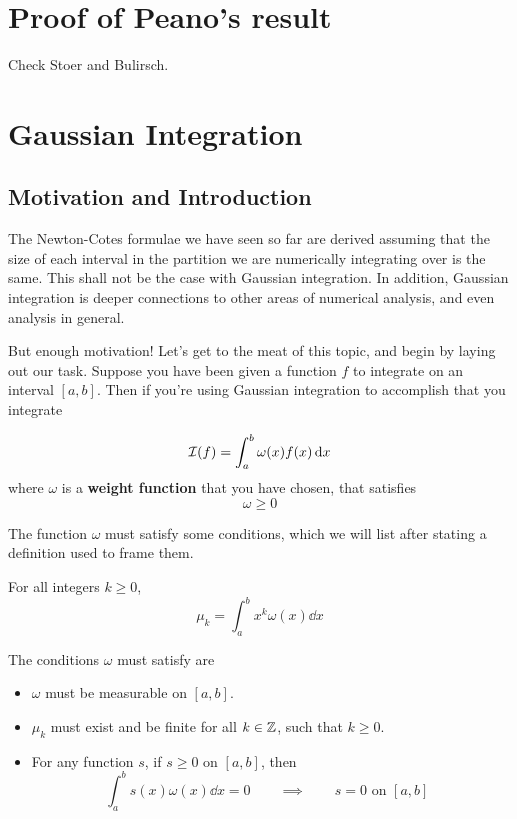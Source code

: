 
\section{Proof of Peano's result}

Check Stoer and Bulirsch.

\section{Gaussian Integration}

\subsection{Motivation and Introduction}

The Newton-Cotes formulae we have seen so far are derived assuming that the size of each interval in the partition we are numerically integrating over is the same. This shall not be the case with Gaussian integration. In addition, Gaussian integration is deeper connections to other areas of numerical analysis, and even analysis in general.

But enough motivation! Let's get to the meat of this topic, and begin by laying out our task. Suppose you have been given a function $f$ to integrate on an interval $[a, b]$. Then if you're using Gaussian integration to accomplish that you integrate
\begin{defn}
  \[
    \mathcal{I}(f) = \int_a^b \omega(x) f(x) \dd{x}
  \]
  where $\omega$ is a \textbf{weight function} that you have chosen, that satisfies
  \[
    \omega \geq 0
  \]
\end{defn}
The function $\omega$ must satisfy some conditions, which we will list after stating a definition used to frame them.
\begin{defn}
  For all integers $k \geq 0$,
  \[
    \mu_k = \int_a^b x^k \omega(x) \dd{x}
  \]
\end{defn}
The conditions $\omega$ must satisfy are
\begin{defn}
  \label{apr4b:conds:weight}
  \hfill

\begin{itemize}
\item
  $\omega$ must be measurable on $[a, b]$.
  
\item
  $\mu_k$ must exist and be finite for all $k \in \mathbb{Z}$, such that $k \geq 0$.

\item
  For any function $s$, if $s \geq 0$ on $[a, b]$, then
  \[
    \int_a^b s(x) \omega(x) \dd{x} = 0
    \qquad \implies \qquad
    s = 0 \text{ on $[a, b]$ }
  \]
\end{itemize}
\end{defn}

